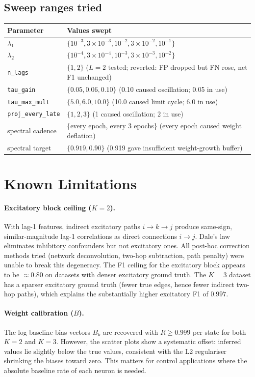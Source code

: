 \documentclass[11pt]{article}
\begin{document}
\subsection*{Sweep ranges tried}

\begin{tabular}{ll}
\toprule
Parameter & Values swept \\
\midrule
$\lambda_1$ & $\{10^{-3},3\times10^{-3},10^{-2},3\times10^{-2},10^{-1}\}$ \\
$\lambda_2$ & $\{10^{-4},3\times10^{-4},10^{-3},3\times10^{-3},10^{-2}\}$ \\
\texttt{n\_lags} & $\{1,2\}$ ($L=2$ tested; reverted: FP dropped but FN rose, net F1 unchanged) \\
\texttt{tau\_gain} & $\{0.05, 0.06, 0.10\}$ (0.10 caused oscillation; 0.05 in use) \\
\texttt{tau\_max\_mult} & $\{5.0, 6.0, 10.0\}$ (10.0 caused limit cycle; 6.0 in use) \\
\texttt{proj\_every\_late} & $\{1, 2, 3\}$ (1 caused oscillation; 2 in use) \\
spectral cadence & \{every epoch, every 3 epochs\} (every epoch caused weight deflation) \\
spectral target & $\{0.919, 0.90\}$ (0.919 gave insufficient weight-growth buffer) \\
\bottomrule
\end{tabular}

\section{Known Limitations}

\paragraph{Excitatory block ceiling ($K=2$).}
With lag-1 features, indirect excitatory paths $i\!\to\!k\!\to\!j$ produce
same-sign, similar-magnitude lag-1 correlations as direct connections $i\!\to\!j$.
Dale's law eliminates inhibitory confounders but not excitatory ones.  All post-hoc
correction methods tried (network deconvolution, two-hop subtraction, path penalty)
were unable to break this degeneracy.  The F1 ceiling for the excitatory block
appears to be $\approx0.80$ on datasets with denser excitatory ground truth.
The $K=3$ dataset has a sparser excitatory ground truth (fewer true edges, hence fewer
indirect two-hop paths), which explains the substantially higher excitatory F1 of $0.997$.

\paragraph{Weight calibration ($B$).}
The log-baseline bias vectors $B_k$ are recovered with $R \ge 0.999$ per state for
both $K=2$ and $K=3$.  However, the scatter plots show a systematic offset: inferred
values lie slightly below the true values, consistent with the L2 regulariser
shrinking the biases toward zero.  This matters for control applications where the
absolute baseline rate of each neuron is needed.
\end{document}

